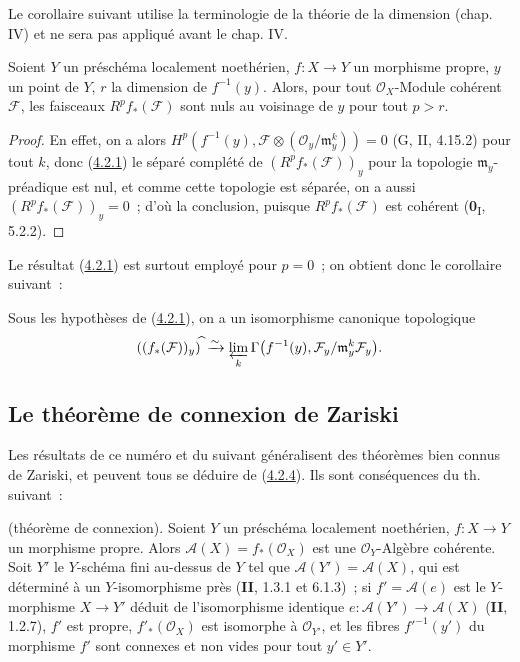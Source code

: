 Le corollaire suivant utilise la terminologie de la théorie de la dimension
(chap. IV) et ne sera pas appliqué avant le chap. IV.

\begin{corollary}[4.2.2]
\label{III.4.2.2-fr}
Soient $Y$ un préschéma localement noethérien, $f:X\to Y$ un morphisme
propre, $y$ un point de $Y$, $r$ la dimension de $f^{-1}(y)$. Alors, pour
tout $\mathcal O_X$-Module cohérent $\mathcal F$, les faisceaux
$R^pf_*(\mathcal F)$ sont nuls au voisinage de $y$ pour tout $p>r$.
\end{corollary}

\begin{proof}
En effet, on a alors
$H^p(f^{-1}(y),
\mathcal F\otimes(\mathcal O_y/\mathfrak m_y^k))=0$
(G, II, 4.15.2) pour tout $k$, donc
(\hyperref[III.4.2.1-fr]{4.2.1}) le séparé complété de
$(R^pf_*(\mathcal F))_y$ pour la topologie $\mathfrak m_y$-préadique est
nul, et comme cette topologie est séparée, on a aussi
$(R^pf_*(\mathcal F))_y=0$~; d'où la conclusion, puisque
$R^pf_*(\mathcal F)$ est cohérent (\textbf{0}\textsubscript{I}, 5.2.2).
\end{proof}

\begin{env}[4.2.3]
\label{III.4.2.3-fr}
Le résultat (\hyperref[III.4.2.1-fr]{4.2.1}) est surtout employé pour
$p=0$~; on obtient donc le corollaire suivant~:
\end{env}

\begin{corollary}[4.2.4]
\label{III.4.2.4-fr}
Sous les hypothèses de \textup{(\hyperref[III.4.2.1-fr]{4.2.1})}, on a un
isomorphisme canonique topologique
\[
((f_*(\mathcal F))_y)^{\widehat{\,}}
\xrightarrow{\sim}
\varprojlim_k\Gamma\bigl(f^{-1}(y),
\mathcal F_y/\mathfrak m_y^k\mathcal F_y\bigr).
\]
\end{corollary}

\subsection{Le théorème de connexion de Zariski}
\label{subsection:III.4.3-fr}
\label{III.4.3-fr}

Les résultats de ce numéro et du suivant généralisent des théorèmes bien
connus de Zariski, et peuvent tous se déduire de
(\hyperref[III.4.2.4-fr]{4.2.4}). Ils sont conséquences du th. suivant~:

\begin{theorem}[4.3.1]
\label{III.4.3.1-fr}
\textnormal{(théorème de connexion).}
Soient $Y$ un préschéma localement noethérien, $f:X\to Y$ un morphisme
propre. Alors $\mathcal A(X)=f_*(\mathcal O_X)$ est une
$\mathcal O_Y$-Algèbre cohérente.
Soit $Y'$ le $Y$-schéma fini au-dessus de $Y$ tel que
$\mathcal A(Y')=\mathcal A(X)$, qui est déterminé à un $Y$-isomorphisme
près \textup{(\textbf{II}, 1.3.1 et 6.1.3)}~; si $f'=\mathcal A(e)$ est le $Y$-morphisme
$X\to Y'$ déduit de l'isomorphisme identique
$e:\mathcal A(Y')\to\mathcal A(X)$ \textup{(\textbf{II}, 1.2.7)}, $f'$ est propre,
$f'_*(\mathcal O_X)$ est isomorphe à $\mathcal O_{Y'}$, et les fibres
$f'^{-1}(y')$ du morphisme $f'$ sont connexes et non vides pour tout
$y'\in Y'$.
\end{theorem}

